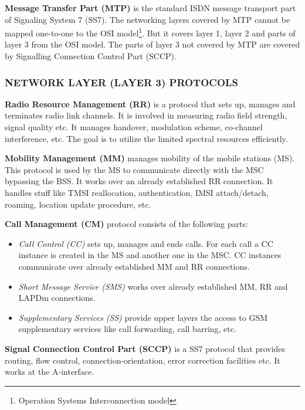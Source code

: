  
 \textbf{Message Transfer Part (MTP)} is the standard ISDN message transport 
 part of Signaling System 7 (SS7). The networking layers covered by MTP cannot
 be mapped
 one-to-one to the OSI model\footnote{Operation Systems Interconnection 
 model}. But it covers layer 1, layer 2 and parts of layer 3 from the OSI 
 model. The parts of layer 3
 not covered by MTP are covered by Signalling Connection Control Part (SCCP).

\subsubsection{\uppercase{Network Layer (Layer 3) protocols}}

\textbf{Radio Resource Management (RR)} is a protocol that sets up, manages 
and terminates
 radio link channels. It is involved in measuring radio field strength, 
 signal quality etc.
 It manages handover, modulation scheme, co-channel interference, etc. The 
 goal is to 
 utilize the limited spectral resources efficiently.
 

\textbf{Mobility Management (MM)} manages mobility of the mobile stations 
(MS). This protocol is used by the MS to communicate directly with the MSC 
bypassing the BSS. It works over an already established
 RR connection. It handles stuff like TMSI reallocation, authentication, 
 IMSI attach/detach, roaming, location update procedure, etc.
 
 
 \textbf{Call Management (CM)} protocol consists of the following parts:
 \begin{itemize}[noitemsep,topsep=0pt,parsep=0pt,partopsep=0pt]
  \item \textit{Call Control (CC)} sets up, manages and ends calls. For each 
  call a CC instance is created in the MS and another one in the MSC. CC 
  instances 
  communicate over already established MM and RR connections.
  \item \textit{Short Message Service (SMS)} works over already established 
  MM, RR and LAPDm connections.
  \item \textit{Supplementary Services (SS)} provide upper layers the access 
  to GSM supplementary services like call forwarding, call barring, etc. 
 \end{itemize}


\textbf{Signal Connection Control Part (SCCP)} is a SS7 protocol that provides
routing, flow control, connection-orientation, error correction facilities 
etc. It
 works at the A-interface.
 
